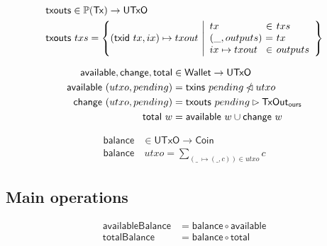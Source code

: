 \documentclass{article}
\newcommand{\powerset}[1]{\mathbb{P}(#1)}
\newcommand{\restrictdom}{\lhd}
\newcommand{\subtractdom}{\mathbin{\slashed{\restrictdom}}}
\newcommand{\restrictrange}{\rhd}
\begin{document}
\begin{equation}
\begin{split}
\mathsf{txouts}&\in \powerset{\mathsf{Tx}} \to \mathsf{UTxO} \\
\mathsf{txouts}& ~ txs =
  \left\{ (\mathsf{txid} ~ tx, ix) \mapsto txout ~
  \middle| \begin{array}{l@{~}c@{~}l}
             tx & \in & txs \\
             (\_, outputs) & = & tx \\
             ix \mapsto txout & \in & outputs
           \end{array}
  \right\}
\end{split}
\end{equation}

\begin{equation}
\begin{split}
\mathsf{available}, \mathsf{change}, \mathsf{total} & \in \mathsf{Wallet} \to \mathsf{UTxO} \\
\mathsf{available} ~ (utxo, pending) & = \mathsf{txins} ~ pending \subtractdom utxo \\
\mathsf{change} ~ (utxo, pending) & =
    \mathsf{txouts} ~ pending \restrictrange \mathsf{TxOut_{ours}} \\
\mathsf{total} ~ w & = \mathsf{available} ~ w \cup \mathsf{change} ~ w \\
\end{split}
\end{equation}

\begin{equation}
\begin{split}
\mathsf{balance}& \in \mathsf{UTxO} \to \mathsf{Coin} \\
\mathsf{balance}& ~ utxo = \sum_{(\_ ~ \mapsto (\_, c)) \in utxo} c
\end{split}
\end{equation}

\subsection{Main operations}
\label{sec:main_operations}

\begin{equation}
\begin{split}
\mathsf{availableBalance} & = \mathsf{balance} \circ \mathsf{available} \\
\mathsf{totalBalance}     & = \mathsf{balance} \circ \mathsf{total}
\end{split}
\end{equation}
\end{document}
